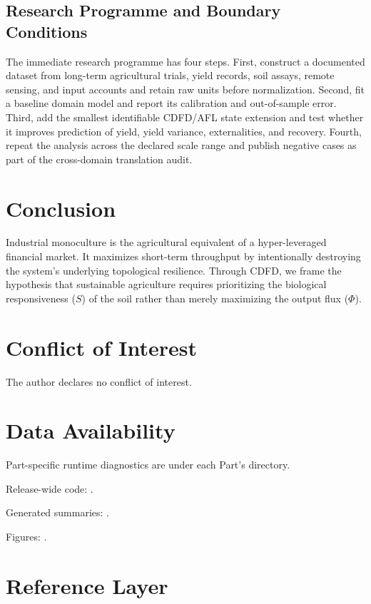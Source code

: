 \documentclass[11pt,a4paper]{article}
\begin{document}
\subsection{Research Programme and Boundary Conditions}

The immediate research programme has four steps. First, construct a documented
dataset from long-term agricultural trials, yield records, soil assays, remote sensing, and input accounts and retain raw units before normalization.
Second, fit a baseline domain model and report its calibration and out-of-sample
error. Third, add the smallest identifiable CDFD/AFL state extension and test
whether it improves prediction of yield, yield variance, externalities, and recovery. Fourth, repeat the
analysis across the declared scale range and publish negative cases as part of
the cross-domain translation audit.


\section{Conclusion}
Industrial monoculture is the agricultural equivalent of a hyper-leveraged financial market. It maximizes short-term throughput by intentionally destroying the system's underlying topological resilience. Through CDFD, we frame the hypothesis that sustainable agriculture requires prioritizing the biological responsiveness ($S$) of the soil rather than merely maximizing the output flux ($\Phi$).
\section*{Conflict of Interest} The author declares no conflict of interest.
\section*{Data Availability}
Part-specific runtime diagnostics are under each Part's  directory.

Release-wide code: .

Generated summaries: .

Figures: .


\section{Reference Layer}


\end{document}
